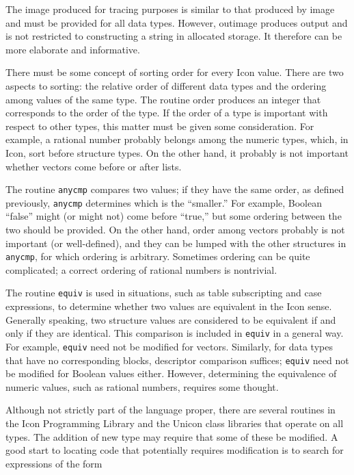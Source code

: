 The image produced for tracing purposes is similar to that produced by
image and must be provided for all data types.  However, outimage
produces output and is not restricted to constructing a string in
allocated storage. It therefore can be more elaborate and informative.

There must be some concept of sorting order for every Icon
value. There are two aspects to sorting: the relative order of
different data types and the ordering among values of the same
type. The routine order produces an integer that corresponds to the
order of the type. If the order of a type is important with respect to
other types, this matter must be given some consideration. For
example, a rational number probably belongs among the numeric types,
which, in Icon, sort before structure types. On the other hand, it
probably is not important whether vectors come before or after lists.


The routine \texttt{anycmp} compares two values; if they have the same
order, as defined previously, \texttt{anycmp} determines which is the
``smaller.''  For example, Boolean ``false'' might (or might not) come
before ``true,'' but some ordering between the two should be provided.
On the other hand, order among vectors probably is not important (or
well-defined), and they can be lumped with the other structures in
\texttt{anycmp}, for which ordering is arbitrary. Sometimes ordering can be
quite complicated; a correct ordering of rational numbers is nontrivial.


The routine \texttt{equiv} is used in situations, such as table
subscripting and case expressions, to determine whether two values are
equivalent in the Icon sense. Generally speaking, two structure values are
considered to be equivalent if and only if they are identical. This
comparison is included in \texttt{equiv} in a general way. For example,
\texttt{equiv} need not be modified for vectors. Similarly, for data types
that have no corresponding blocks, descriptor comparison suffices;
\texttt{equiv} need not be modified for Boolean values either. However,
determining the equivalence of numeric values, such as rational numbers,
requires some thought.

Although not strictly part of the language proper, there are several
routines in the Icon Programming Library and the Unicon class libraries
that operate on all types. The addition of new type may require that some
of these be modified. A good start to locating code that potentially
requires modification is to search for expressions of the form

